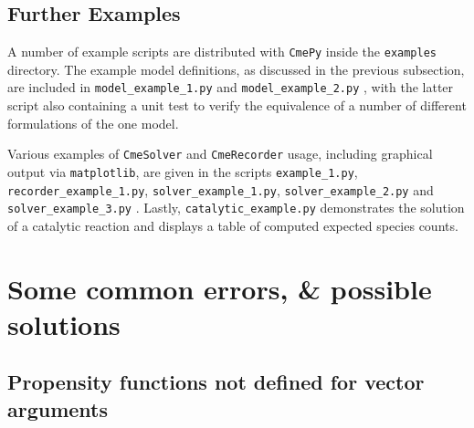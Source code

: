 \documentclass{article}
\newcommand{\mono}[1]{\texttt{#1}}
\newcommand{\cmepy}{\mono{CmePy}}
\newcommand{\matplotlib}{\mono{matplotlib}}
\begin{document}
\subsection{Further Examples}

A number of example scripts are distributed with \cmepy{} inside the
\mono{examples} directory. The example model definitions,
as discussed in the previous subsection, are included in
\mono{model\_example\_1.py} and \mono{model\_example\_2.py} , with
the latter script also containing a unit test to verify the equivalence of
a number of different formulations of the one model.

Various examples of \mono{CmeSolver} and \mono{CmeRecorder} usage,
including graphical output via \matplotlib{}, are
given in the scripts
\mono{example\_1.py},
\mono{recorder\_example\_1.py},
\mono{solver\_example\_1.py},
\mono{solver\_example\_2.py}
and
\mono{solver\_example\_3.py} .
Lastly, \mono{catalytic\_example.py} demonstrates the solution of
a catalytic reaction and displays a table of computed expected species counts.

\section{Some common errors, \& possible solutions}

\subsection{Propensity functions not defined for vector arguments}
\end{document}

